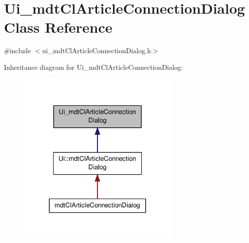 \hypertarget{class_ui__mdt_cl_article_connection_dialog}{\section{Ui\-\_\-mdt\-Cl\-Article\-Connection\-Dialog Class Reference}
\label{class_ui__mdt_cl_article_connection_dialog}
}


{\ttfamily \#include $<$ui\-\_\-mdt\-Cl\-Article\-Connection\-Dialog.\-h$>$}



Inheritance diagram for Ui\-\_\-mdt\-Cl\-Article\-Connection\-Dialog\-:\nopagebreak
\begin{figure}[H]
\begin{center}
\leavevmode
\includegraphics[width=228pt]{class_ui__mdt_cl_article_connection_dialog__inherit__graph}
\end{center}
\end{figure}


